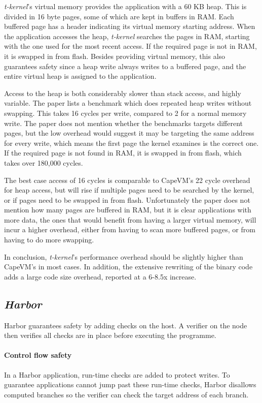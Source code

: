 \emph{t-kernel}'s virtual memory provides the application with a 60 KB heap. This is divided in 16 byte pages, some of which are kept in buffers in RAM. Each buffered page has a header indicating its virtual memory starting address. When the application accesses the heap, \emph{t-kernel} searches the pages in RAM, starting with the one used for the most recent access. If the required page is not in RAM, it is swapped in from flash. Besides providing virtual memory, this also guarantees safety since a heap write always writes to a buffered page, and the entire virtual heap is assigned to the application.

Access to the heap is both considerably slower than stack access, and highly variable. The paper lists a benchmark which does repeated heap writes without swapping. This takes 16 cycles per write, compared to 2 for a normal memory write. The paper does not mention whether the benchmarks targets different pages, but the low overhead would suggest it may be targeting the same address for every write, which means the first page the kernel examines is the correct one. If the required page is not found in RAM, it is swapped in from flash, which takes over 180,000 cycles.

The best case access of 16 cycles is comparable to CapeVM's 22 cycle overhead for heap access, but will rise if multiple pages need to be searched by the kernel, or if pages need to be swapped in from flash. Unfortunately the paper does not mention how many pages are buffered in RAM, but it is clear applications with more data, the ones that would benefit from having a larger virtual memory, will incur a higher overhead, either from having to scan more buffered pages, or from having to do more swapping.

In conclusion, \emph{t-kernel}'s performance overhead should be slightly higher than CapeVM's in most cases. In addition, the extensive rewriting of the binary code adds a large code size overhead, reported at a 6-8.5x increase.




\subsection{\emph{Harbor}}
Harbor guarantees safety by adding checks on the host. A verifier on the node then verifies all checks are in place before executing the programme.

\paragraph{Control flow safety}
In a Harbor application, run-time checks are added to protect writes. To guarantee applications cannot jump past these run-time checks, Harbor disallows computed branches so the verifier can check the target address of each branch.

